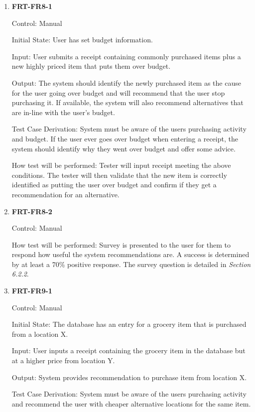 \documentclass[12pt, titlepage]{article}
\begin{document}
\begin{enumerate}

\item{\textbf{FRT-FR8-1}}

Control: Manual
          
Initial State: User has set budget information.

Input: User submits a receipt containing commonly purchased items plus a new highly priced item that puts them over budget.
          
Output: The system should identify the newly purchased item as the cause for the user going over budget and will recommend that the user stop purchasing it. If available, the system will also recommend alternatives that are in-line with the user's budget.

Test Case Derivation: System must be aware of the users purchasing activity and budget. If the user ever goes over budget when entering
a receipt, the system should identify why they went over budget and offer some advice.
          
How test will be performed: Tester will input receipt meeting the above conditions. The tester will then validate that the new item is correctly identified as putting the user over budget and confirm if they get a recommendation for an alternative.

\item{\textbf{FRT-FR8-2}}

Control: Manual

How test will be performed: Survey is presented to the user for them to respond how useful the system recommendations are. A success is determined by at least a 70\% positive response. The survey question is detailed in \textit{Section 6.2.2}.

\item{\textbf{FRT-FR9-1}}

Control: Manual
          
Initial State: The database has an entry for a grocery item that is purchased from a location X.

Input: User inputs a receipt containing the grocery item in the database but at a higher price from location Y.
          
Output: System provides recommendation to purchase item from location X.

Test Case Derivation: System must be aware of the users purchasing activity and recommend the user with cheaper alternative locations for
the same item.
          

\end{enumerate}
\end{document}
